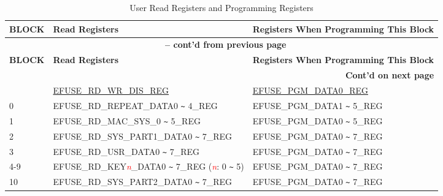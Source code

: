 \begin{longtable}[c]{|l|l|l|}
\caption{User Read Registers and Programming Registers}
\label{tab:efuse-softw-read-para}
\\\hline
    \rowcolor{lightgray}
        \textbf{BLOCK} & \textbf{Read Registers} & \textbf{Registers When Programming This Block}\\
    \endfirsthead
    
    \multicolumn{3}{c}{\bfseries \tablename\ \thetable{} -- cont'd from previous page}\\\hline
    
    \rowcolor{lightgray}
        \textbf{BLOCK} & \textbf{Read Registers} & \textbf{Registers When Programming This Block}\\
    \endhead
    
    \multicolumn{3}{r}{\textbf{Cont'd on next page}} \\
    \endfoot
    \endlastfoot
    \hline
0  & \hyperref[regdesc:EFUSERDWRDISREG]{EFUSE\_RD\_WR\_DIS\_REG} & \hyperref[regdesc:EFUSEPGMDATANREG]{EFUSE\_PGM\_DATA0\_REG} \\\hline
0  & EFUSE\_RD\_REPEAT\_DATA0 \verb+~+ 4\_REG & EFUSE\_PGM\_DATA1 \verb+~+ 5\_REG \\\hline
1  & EFUSE\_RD\_MAC\_SYS\_0 \verb+~+ 5\_REG & EFUSE\_PGM\_DATA0 \verb+~+ 5\_REG \\\hline
2  & EFUSE\_RD\_SYS\_PART1\_DATA0 \verb+~+ 7\_REG & EFUSE\_PGM\_DATA0 \verb+~+ 7\_REG \\\hline
3  & EFUSE\_RD\_USR\_DATA0 \verb+~+ 7\_REG & EFUSE\_PGM\_DATA0 \verb+~+ 7\_REG \\ \hline
4-9 & EFUSE\_RD\_KEY\textcolor{red}{\it{n}}\_DATA0 \verb+~+ 7\_REG (\textcolor{red}{\it{n}}: 0 \verb+~+ 5) & EFUSE\_PGM\_DATA0 \verb+~+ 7\_REG \\\hline
10 & EFUSE\_RD\_SYS\_PART2\_DATA0 \verb+~+ 7\_REG & EFUSE\_PGM\_DATA0 \verb+~+ 7\_REG \\\hline
\end{longtable}
